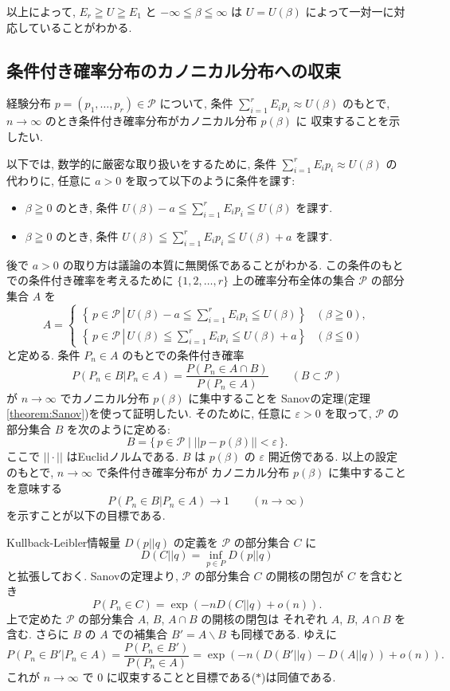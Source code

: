 \documentclass[12pt,twoside]{jarticle}
\newcommand\eps{\varepsilon}
\renewcommand\setminus{\smallsetminus}
\newcommand\cP{{\mathcal P}}
\theoremstyle{definition} %
\theoremstyle{definition} %
\theoremstyle{definition} %
\numberwithin{theorem}{section}
\numberwithin{equation}{section}
\numberwithin{figure}{section}
\numberwithin{table}{section}
\newcommand\theoremref[1]{定理\ref{#1}}
\begin{document}
以上によって, $E_r\geqq U\geqq E_1$ と $-\infty\leqq\beta\leqq\infty$
は $U=U(\beta)$ によって一対一に対応していることがわかる.


\subsection{条件付き確率分布のカノニカル分布への収束}

経験分布 $p=(p_1,\ldots,p_r)\in\cP$ について, 
条件 $\sum_{i=1}^r E_i p_i\approx U(\beta)$ のもとで,  
$n\to\infty$ のとき条件付き確率分布がカノニカル分布 $p(\beta)$ に
収束することを示したい.

以下では, 数学的に厳密な取り扱いをするために,
条件 $\sum_{i=1}^r E_i p_i\approx U(\beta)$ の代わりに,
任意に $a>0$ を取って以下のように条件を課す:
\begin{itemize}
\item $\beta\geqq 0$ のとき, 条件 \(
\displaystyle
U(\beta)-a \leqq \sum_{i=1}^r E_i p_i \leqq U(\beta)
\) を課す. 
\item $\beta\geqq 0$ のとき, 条件 \(
\displaystyle
U(\beta)\leqq \sum_{i=1}^r E_i p_i \leqq U(\beta)+a
\) を課す. 
\end{itemize}
後で $a>0$ の取り方は議論の本質に無関係であることがわかる.
この条件のもとでの条件付き確率を考えるために
$\{1,2,\ldots,r\}$ 上の確率分布全体の集合 $\cP$ の部分集合 $A$ を
\[
A =
\begin{cases}
\left\{\,p\in\cP \,\left|\, 
U(\beta)-a \leqq \sum_{i=1}^r E_i p_i \leqq U(\beta) \right.\right\} 
& (\beta\geqq 0), 
\\
\left\{\, p\in\cP \,\left|\, 
U(\beta)\leqq \sum_{i=1}^r E_i p_i \leqq U(\beta)+a \right.\right\} 
& (\beta\leqq 0)
\end{cases}
\]
と定める. 条件 $P_n\in A$ のもとでの条件付き確率
\[
P(P_n\in B|P_n\in A)=\frac{P(P_n\in A\cap B)}{P(P_n\in A)}
\qquad (B\subset\cP)
\]
が $n\to\infty$ でカノニカル分布 $p(\beta)$ に集中することを
Sanovの定理(\theoremref{theorem:Sanov})を使って証明したい. 
そのために, 任意に $\eps>0$ を取って, 
$\cP$ の部分集合 $B$ を次のように定める:
\[
B = \{\,p\in\cP \mid ||p-p(\beta)||<\eps \,\}.
\]
ここで $||\cdot||$ はEuclidノルムである.
$B$ は $p(\beta)$ の $\eps$ 開近傍である.
以上の設定のもとで, $n\to\infty$ で条件付き確率分布が
カノニカル分布 $p(\beta)$ に集中することを意味する
\[
P(P_n\in B|P_n\in A)\to 1
\qquad (n\to\infty)
\tag{$*$}
\]
を示すことが以下の目標である.

Kullback-Leibler情報量 $D(p||q)$ の定義を $\cP$ の部分集合 $C$ に
\[
D(C||q) = \inf_{p\in P}D(p||q)
\]
と拡張しておく. 
Sanovの定理より, $\cP$ の部分集合 $C$ の開核の閉包が $C$ を含むとき 
\[
P(P_n\in C) = \exp(-n D(C||q) + o(n)).
\]
上で定めた $\cP$ の部分集合 $A$, $B$, $A\cap B$ の開核の閉包は
それぞれ $A$, $B$, $A\cap B$ を含む. 
さらに $B$ の $A$ での補集合 $B'=A\setminus B$ も同様である.
ゆえに
\[
P(P_n\in B'|P_n\in A)
=\frac{P(P_n\in B')}{P(P_n\in A)}
=\exp(-n(D(B'||q)-D(A||q))+o(n)).
\]
これが $n\to\infty$ で $0$ に収束することと目標である($*$)は同値である.
\end{document}
